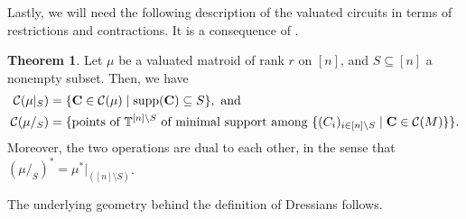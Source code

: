 \documentclass[11pt]{amsart}
\newcommand{\cc}{\mathcal C}
\theoremstyle{definition}
\newtheorem{thm}{Theorem}[subsection]
\newcommand{\chris}[1]{{\color{cyan} \sf Chris: [#1]}}
\begin{document}
Lastly, we will need the following description of the valuated circuits in terms of restrictions and contractions.  It is a consequence of \cite[Theorem 3.29 \& Corollary 4.10.(1)]{BB19}.

\begin{thm}\label{thm:circuitsvalmat}
Let $\mu$ be a valuated matroid of rank $r$ on $[n]$, and $S\subseteq [n]$ a nonempty subset.  Then, we have
\[
\begin{split}
\cc(\mu|_S) &= \{\mathbf C \in \cc(\mu) \mid \operatorname{supp}(\mathbf C) \subseteq S\}, \textnormal{ and }\\
\cc(\mu/_S) &= \{\textnormal{points of }\mathbb T^{[n]\setminus S}\textnormal{ of minimal support among }\{ (C_i)_{i\in [n]\setminus S} \mid \mathbf C\in \cc(M)\}\}.
\end{split}
\]
Moreover, the two operations are dual to each other, in the sense that $(\mu/_S)^* = \mu^*|_{([n]\setminus S)}$.
\end{thm}

The underlying geometry behind the definition of Dressians follows.
\end{document}
